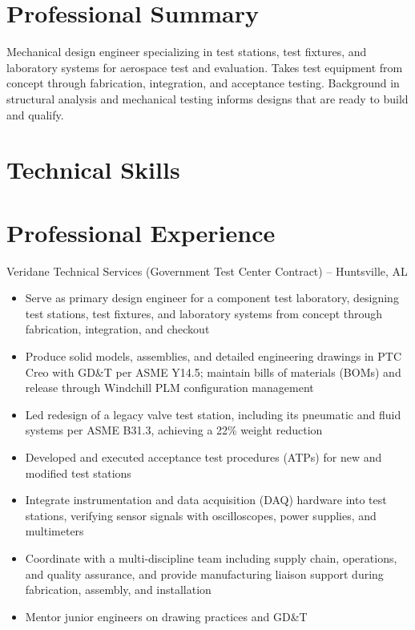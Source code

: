 \documentclass{resume}
\begin{document}
\makeheader

\section*{Professional Summary}
Mechanical design engineer specializing in test stations, test fixtures, and laboratory systems for aerospace test and evaluation. Takes test equipment from concept through fabrication, integration, and acceptance testing. Background in structural analysis and mechanical testing informs designs that are ready to build and qualify.

\section*{Technical Skills}

\section*{Professional Experience}
     {Veridane Technical Services (Government Test Center Contract) -- Huntsville, AL}
\begin{itemize}
  \item Serve as primary design engineer for a component test laboratory, designing test stations, test fixtures, and laboratory systems from concept through fabrication, integration, and checkout
  \item Produce solid models, assemblies, and detailed engineering drawings in PTC Creo with GD\&T per ASME Y14.5; maintain bills of materials (BOMs) and release through Windchill PLM configuration management
  \item Led redesign of a legacy valve test station, including its pneumatic and fluid systems per ASME B31.3, achieving a 22\% weight reduction
  \item Developed and executed acceptance test procedures (ATPs) for new and modified test stations
  \item Integrate instrumentation and data acquisition (DAQ) hardware into test stations, verifying sensor signals with oscilloscopes, power supplies, and multimeters
  \item Coordinate with a multi-discipline team including supply chain, operations, and quality assurance, and provide manufacturing liaison support during fabrication, assembly, and installation
  \item Mentor junior engineers on drawing practices and GD\&T
\end{itemize}
\end{document}
